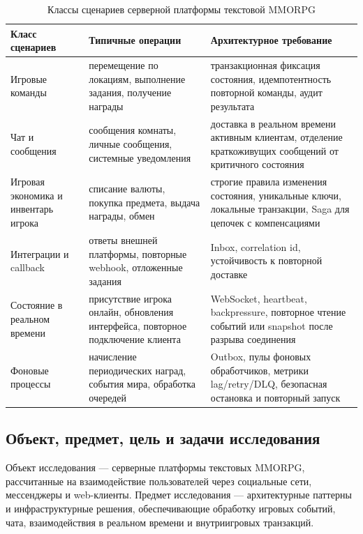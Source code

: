 \documentclass[a4paper,14pt]{extarticle}
\newcommand{\tablefont}{\scriptsize}
\renewcommand{\toprule}{\hline}
\renewcommand{\midrule}{\hline}
\renewcommand{\bottomrule}{\hline}
\numberwithin{figure}{section}
\numberwithin{table}{section}
\begin{document}
\begin{table}[H]
\centering
\caption{Классы сценариев серверной платформы текстовой MMORPG}
\label{tab:scenario-classes}
\tablefont
\setlength{\tabcolsep}{3pt}
\renewcommand{\arraystretch}{1.15}
\begin{tabular}{|L{3.3cm}|L{5.0cm}|L{6.1cm}|}
\toprule
Класс сценариев & Типичные операции & Архитектурное требование \\
\midrule
Игровые команды & перемещение по локациям, выполнение задания, получение награды & транзакционная фиксация состояния, идемпотентность повторной команды, аудит результата \\
\hline
Чат и сообщения & сообщения комнаты, личные сообщения, системные уведомления & доставка в реальном времени активным клиентам, отделение краткоживущих сообщений от критичного состояния \\
\hline
Игровая экономика и инвентарь игрока & списание валюты, покупка предмета, выдача награды, обмен & строгие правила изменения состояния, уникальные ключи, локальные транзакции, Saga для цепочек с компенсациями \\
\hline
Интеграции и callback & ответы внешней платформы, повторные webhook, отложенные задания & Inbox, correlation id, устойчивость к повторной доставке \\
\hline
Состояние в реальном времени & присутствие игрока онлайн, обновления интерфейса, повторное подключение клиента & WebSocket, heartbeat, backpressure, повторное чтение событий или snapshot после разрыва соединения \\
\hline
Фоновые процессы & начисление периодических наград, события мира, обработка очередей & Outbox, пулы фоновых обработчиков, метрики lag/retry/DLQ, безопасная остановка и повторный запуск \\
\bottomrule
\end{tabular}
\end{table}

\subsection{Объект, предмет, цель и задачи исследования}
Объект исследования --- серверные платформы текстовых MMORPG, рассчитанные на взаимодействие пользователей через социальные сети, мессенджеры и web-клиенты. Предмет исследования --- архитектурные паттерны и инфраструктурные решения, обеспечивающие обработку игровых событий, чата, взаимодействия в реальном времени и внутриигровых транзакций.
\end{document}
